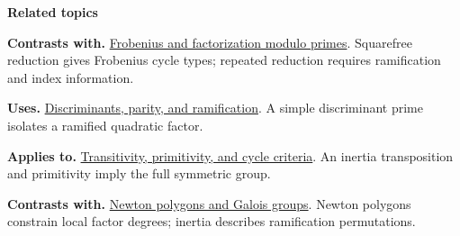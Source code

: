 \documentclass[11pt,a4paper,oneside,openany]{book}
\begin{document}
\par\medskip\begingroup\footnotesize\setlength{\parskip}{1pt}\textbf{\sffamily\color{atlasgreen}Related topics}\par
\color{black}\textbf{Contrasts with.} \hyperlink{article:frobenius}{Frobenius and factorization modulo primes}. Squarefree reduction gives Frobenius cycle types; repeated reduction requires ramification and index information.\par
\color{black}\textbf{Uses.} \hyperlink{article:discriminants}{Discriminants, parity, and ramification}. A simple discriminant prime isolates a ramified quadratic factor.\par
\color{black}\textbf{Applies to.} \hyperlink{article:permutation-groups}{Transitivity, primitivity, and cycle criteria}. An inertia transposition and primitivity imply the full symmetric group.\par
\color{black}\textbf{Contrasts with.} \hyperlink{article:newton-polygons}{Newton polygons and Galois groups}. Newton polygons constrain local factor degrees; inertia describes ramification permutations.\par
\endgroup
\end{document}

